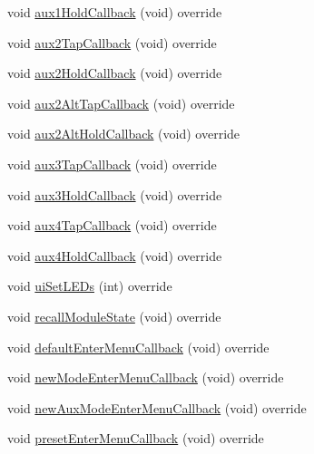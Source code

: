 \begin{DoxyCompactItemize}
void \mbox{\hyperlink{class_via_meta_1_1_via_meta_u_i_a1c38639df8fdb4a866622388548bc9db}{aux1\+Hold\+Callback}} (void) override
\item 
void \mbox{\hyperlink{class_via_meta_1_1_via_meta_u_i_a2d1e0164ad7d84c410cc90cefe9730ce}{aux2\+Tap\+Callback}} (void) override
\item 
void \mbox{\hyperlink{class_via_meta_1_1_via_meta_u_i_a19cac5da8e89446d5ee2a2c889a6c555}{aux2\+Hold\+Callback}} (void) override
\item 
void \mbox{\hyperlink{class_via_meta_1_1_via_meta_u_i_a5982022f5c08ce9aaa75173209d30e6c}{aux2\+Alt\+Tap\+Callback}} (void) override
\item 
void \mbox{\hyperlink{class_via_meta_1_1_via_meta_u_i_a372fe7280f3107f81e7283ba7451efd6}{aux2\+Alt\+Hold\+Callback}} (void) override
\item 
void \mbox{\hyperlink{class_via_meta_1_1_via_meta_u_i_a4f9a282e24dd484d24657a1568defd75}{aux3\+Tap\+Callback}} (void) override
\item 
void \mbox{\hyperlink{class_via_meta_1_1_via_meta_u_i_ad15168253fc76c7a938ca467ada12ade}{aux3\+Hold\+Callback}} (void) override
\item 
void \mbox{\hyperlink{class_via_meta_1_1_via_meta_u_i_ad8e6300990d654091672b0f94a9b47d8}{aux4\+Tap\+Callback}} (void) override
\item 
void \mbox{\hyperlink{class_via_meta_1_1_via_meta_u_i_a2a1cfb3452d150af61f61716aa94f782}{aux4\+Hold\+Callback}} (void) override
\item 
void \mbox{\hyperlink{class_via_meta_1_1_via_meta_u_i_a54f7dbc780758a9842836a9cdd3239a0}{ui\+Set\+L\+E\+Ds}} (int) override
\item 
void \mbox{\hyperlink{class_via_meta_1_1_via_meta_u_i_a40b2c4c2139c78f273d923fdb0d3f4ce}{recall\+Module\+State}} (void) override
\item 
void \mbox{\hyperlink{class_via_meta_1_1_via_meta_u_i_a632c291b811cf6e704e913060083dd7d}{default\+Enter\+Menu\+Callback}} (void) override
\item 
void \mbox{\hyperlink{class_via_meta_1_1_via_meta_u_i_a6adf1a02d1e513a13727982347ecbe72}{new\+Mode\+Enter\+Menu\+Callback}} (void) override
\item 
void \mbox{\hyperlink{class_via_meta_1_1_via_meta_u_i_a5a1034beff03b3c5cdc12a9b3a7d0834}{new\+Aux\+Mode\+Enter\+Menu\+Callback}} (void) override
\item 
void \mbox{\hyperlink{class_via_meta_1_1_via_meta_u_i_a21cd6b42537b8abe34cfe65258455991}{preset\+Enter\+Menu\+Callback}} (void) override

\end{DoxyCompactItemize}
